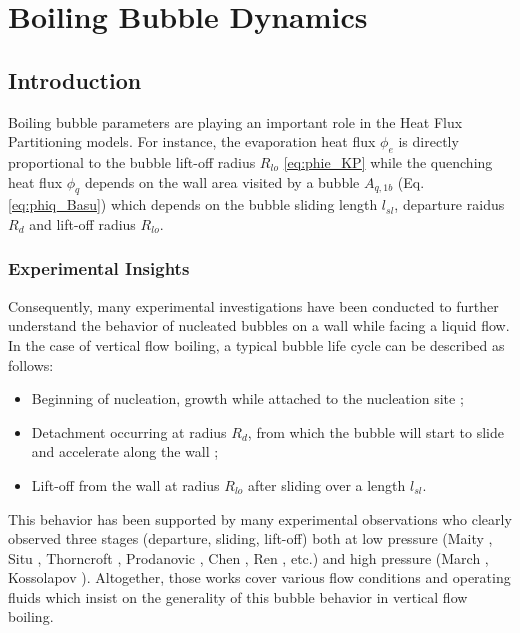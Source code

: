 
\chapter{Boiling Bubble Dynamics} %

\label{ch:bub_dyn} %


\section{Introduction}

Boiling bubble parameters are playing an important role in the Heat Flux Partitioning models. For instance, the evaporation heat flux $\phi_{e}$ is directly proportional to the bubble lift-off radius $R_{lo}$ \ref{eq:phie_KP} while the quenching heat flux $\phi_{q}$ depends on the wall area visited by a bubble $A_{q,1b}$ (Eq. \ref{eq:phiq_Basu}) which depends on the bubble sliding length $l_{sl}$, departure raidus $R_{d}$ and lift-off radius $R_{lo}$.

\subsection{Experimental Insights}

Consequently, many experimental investigations have been conducted to further understand the behavior of nucleated bubbles on a wall while facing a liquid flow. In the case of vertical flow boiling, a typical bubble life cycle can be described as follows:

\begin{itemize}
\item Beginning of nucleation, growth while attached to the nucleation site ;

\item Detachment occurring at radius $R_{d}$, from which the bubble will start to slide and accelerate along the wall ;

\item Lift-off from the wall at radius $R_{lo}$ after sliding over a length $l_{sl}$.

\end{itemize}


This behavior has been supported by many experimental observations who clearly observed three stages (departure, sliding, lift-off) both at low pressure (Maity \cite{maity_effect_2000}, Situ \cite{situ_bubble_2005}, Thorncroft \cite{thorncroft_experimental_1998}, Prodanovic \cite{prodanovic_2006}, Chen \cite{chen_prediction_2012}, Ren \cite{ren_development_2020}, etc.) and high pressure (March \cite{march_1990}, Kossolapov \cite{kossolapov_experimental_2021}). Altogether, those works cover various flow conditions and operating fluids which insist on the generality of this bubble behavior in vertical flow boiling.


